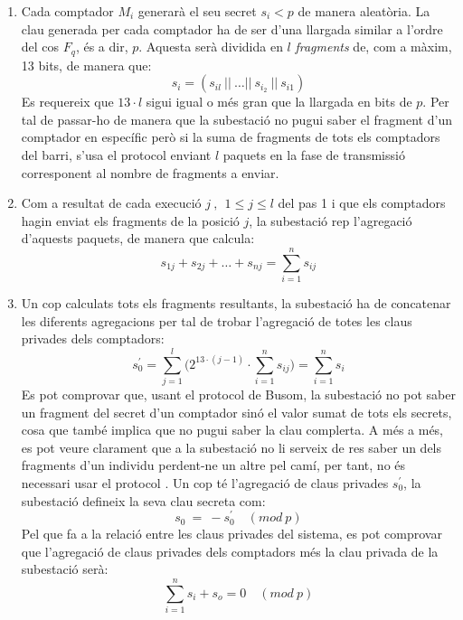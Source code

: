 \documentclass{article}
\begin{document}
\begin{enumerate}
	\item Cada comptador $M_i$ generarà el seu secret $s_i < p$ de manera aleatòria. La clau generada per cada comptador ha de ser d'una llargada similar a l'ordre del cos $F_q$, és a dir, $p$. Aquesta serà dividida en $l$ \textit{fragments} de, com a màxim, 13 bits, de manera que:
	\[s_i = (s_{il}\ ||\ \dots ||\ s_{i_2}\ ||\ s_{i1})\]
	Es requereix que $13 \cdot l$ sigui igual o més gran que la llargada en bits de $p$. Per tal de passar-ho de manera que la subestació no pugui saber el fragment d'un comptador en específic però si la suma de fragments de tots els comptadors del barri, s'usa el protocol \cite{busom} enviant $l$ paquets en la fase de transmissió corresponent al nombre de fragments a enviar.
	\item Com a resultat de cada execució $j \ , \ \ 1 \le j \le l$ del pas 1 i que els comptadors hagin enviat els fragments de la posició $j$, la subestació rep l'agregació d'aquests paquets, de manera que calcula:
	\[s_{1j} + s_{2j} + \dots + s_{nj} = \sum_{i=1}^{n} s_{ij}\]
	\item Un cop calculats tots els fragments resultants, la subestació ha de concatenar les diferents agregacions per tal de trobar l'agregació de totes les claus privades dels comptadors:
	\[s_0^{'} = \sum_{j=1}^{l} \Big( 2^{13 \cdot (j - 1)} \cdot \sum_{i=1}^{n} s_{ij} \Big) = \sum_{i=1}^{n} s_i\]
	Es pot comprovar que, usant el protocol de Busom, la subestació no pot saber un fragment del secret d'un comptador sinó el valor sumat de tots els secrets, cosa que també implica que no pugui saber la clau complerta. A més a més, es pot veure clarament que a la subestació no li serveix de res saber un dels fragments d'un individu perdent-ne un altre pel camí, per tant, no és necessari usar el protocol \cite{repair-busom}. Un cop té l'agregació de claus privades $s_0^{'}$, la subestació defineix la seva clau secreta com:
	\[s_0\ =\ - s_0^{'} \quad (mod \ p)\]
	Pel que fa a la relació entre les claus privades del sistema, es pot comprovar que l'agregació de claus privades dels comptadors més la clau privada de la subestació serà:
	\[\sum_{i=1}^{n} s_i + s_o = 0 \quad (mod \ p)\] 
\end{enumerate}
\end{document}
